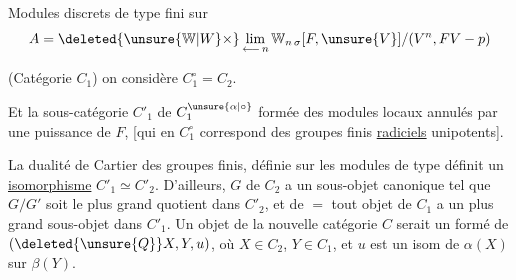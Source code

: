 
Modules discrets  de type fini sur
\[
A=\deleted{\unsure{\mathbb W|W}\times}\lim_{\longleftarrow\,n}\mathbb W_{n\,\sigma}[F,\unsure{V}]/(V^n,FV-p)
\]

(Catégorie $C_1$) on considère $C_1^\circ=C_2$.

Et la sous-catégorie  $C'_1$ de $C_1^{\unsure{\alpha|\circ}}$ formée des modules locaux annulés par une puissance de $F$, [qui en $C_1^\circ$ correspond    des groupes finis \uline{radiciels} unipotents].


La dualité de Cartier des groupes finis, définie  sur les modules de type  définit un \uline{isomorphisme} $C'_1\simeq C'_2$.
D'ailleurs,  $G$ de $C_2$ a un sous-objet canonique tel que $G/G'$ soit le plus grand quotient dans $C'_2$, et de $=$ tout objet de $C_1$ a un plus grand sous-objet  dans $C'_1$. Un objet de la nouvelle catégorie $C$ serait un   formé de  $(\deleted{\unsure{Q}}X,Y,u)$, où $X\in C_2$, $Y\in C_1$, et $u$ est un isom de $\alpha(X)$ sur $\beta(Y)$.

